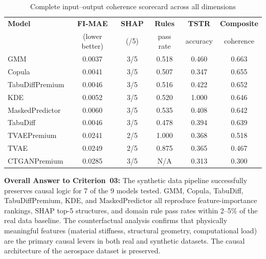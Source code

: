 \documentclass[12pt,a4paper]{article}
\begin{document}
\begin{table}[H]
\centering
\caption{Complete input--output coherence scorecard across all dimensions}
\label{tab:scorecard}
\renewcommand{\arraystretch}{1.3}
\begin{tabular}{lccccc}
\toprule
\textbf{Model} & \textbf{FI-MAE} & \textbf{SHAP} & \textbf{Rules} & \textbf{TSTR} & \textbf{Composite} \\
& \footnotesize{(lower better)} & \footnotesize{(/5)} & \footnotesize{pass rate} & \footnotesize{accuracy} & \footnotesize{coherence} \\
\midrule
GMM             & 0.0037 & 3/5 & 0.518 & 0.460 & \cellcolor{success!20}0.663 \\
Copula          & 0.0041 & 3/5 & 0.507 & 0.347 & \cellcolor{success!15}0.655 \\
TabuDiffPremium & 0.0046 & 3/5 & 0.516 & 0.422 & \cellcolor{success!12}0.652 \\
KDE             & 0.0052 & 3/5 & 0.520 & 1.000 & \cellcolor{success!10}0.646 \\
MaskedPredictor & 0.0060 & 3/5 & 0.535 & 0.408 & \cellcolor{success!8}0.642 \\
TabuDiff        & 0.0046 & 3/5 & 0.478 & 0.394 & \cellcolor{success!6}0.639 \\
TVAEPremium     & 0.0241 & 2/5 & 1.000 & 0.368 & \cellcolor{highlight!15}0.518 \\
TVAE            & 0.0249 & 2/5 & 0.875 & 0.365 & \cellcolor{highlight!10}0.467 \\
CTGANPremium    & 0.0285 & 3/5 & N/A   & 0.313 & \cellcolor{danger!10}0.300 \\
\bottomrule
\end{tabular}
\end{table}

\vspace{1em}
\begin{tcolorbox}[metricbox]
\textbf{Overall Answer to Criterion~03:} The synthetic data pipeline successfully preserves causal logic for 7 of the 9 models tested. GMM, Copula, TabuDiff, TabuDiffPremium, KDE, and MaskedPredictor all reproduce feature-importance rankings, SHAP top-5 structures, and domain rule pass rates within 2--5\% of the real data baseline. The counterfactual analysis confirms that physically meaningful features (material stiffness, structural geometry, computational load) are the primary causal levers in both real and synthetic datasets. The causal architecture of the aerospace dataset is preserved.
\end{tcolorbox}
\end{document}
